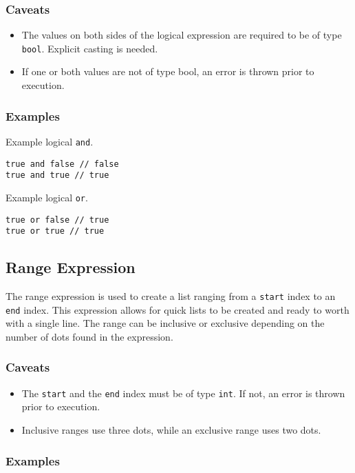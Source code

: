 \subsubsection{Caveats}

\begin{itemize}
    \item The values on both sides of the logical expression are required to be of type \texttt{bool}. Explicit casting is needed.
    \item If one or both values are not of type bool, an error is thrown prior to execution.
\end{itemize}

\subsubsection{Examples}

Example logical \texttt{and}.
\begin{lstlisting}
true and false // false
true and true // true
\end{lstlisting}
Example logical \texttt{or}.
\begin{lstlisting}
true or false // true
true or true // true
\end{lstlisting}

\subsection{Range Expression}

The range expression is used to create a list ranging from a \texttt{start} index to an \texttt{end} index.
This expression allows for quick lists to be created and ready to worth with a single line. The range can be
inclusive or exclusive depending on the number of dots found in the expression.

\subsubsection{Caveats}

\begin{itemize}
    \item The \texttt{start} and the \texttt{end} index must be of type \texttt{int}. If not, an error is thrown prior to execution.
    \item Inclusive ranges use three dots, while an exclusive range uses two dots.
\end{itemize}

\subsubsection{Examples}

